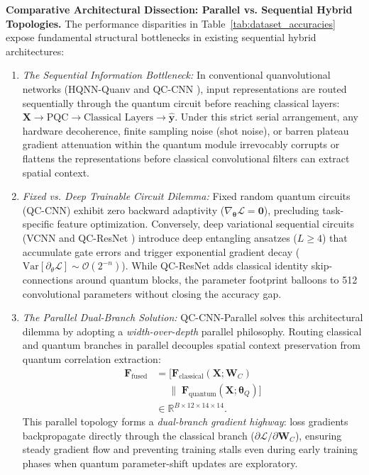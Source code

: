 \documentclass[journal]{IEEEtran}
\begin{document}
\textbf{Comparative Architectural Dissection: Parallel vs. Sequential Hybrid Topologies.} 
The performance disparities in Table~\ref{tab:dataset_accuracies} expose fundamental structural bottlenecks in existing sequential hybrid architectures:
\begin{enumerate}
    \item \textit{The Sequential Information Bottleneck:} In conventional quanvolutional networks (HQNN-Quanv \cite{senokosov2024quantum} and QC-CNN \cite{henderson2020quanvolutional}), input representations are routed sequentially through the quantum circuit before reaching classical layers: $\mathbf{X} \to \text{PQC} \to \text{Classical Layers} \to \hat{\mathbf{y}}$. Under this strict serial arrangement, any hardware decoherence, finite sampling noise (shot noise), or barren plateau gradient attenuation within the quantum module irrevocably corrupts or flattens the representations before classical convolutional filters can extract spatial context.
    \item \textit{Fixed vs. Deep Trainable Circuit Dilemma:} Fixed random quantum circuits (QC-CNN) exhibit zero backward adaptivity ($\nabla_{\boldsymbol{\theta}} \mathcal{L} = \mathbf{0}$), precluding task-specific feature optimization. Conversely, deep variational sequential circuits (VCNN and QC-ResNet \cite{kashif2024resqnets}) introduce deep entangling ansatzes ($L \ge 4$) that accumulate gate errors and trigger exponential gradient decay ($\mathrm{Var}[\partial_{\theta} \mathcal{L}] \sim \mathcal{O}(2^{-n})$). While QC-ResNet adds classical identity skip-connections around quantum blocks, the parameter footprint balloons to 512 convolutional parameters without closing the accuracy gap.
    \item \textit{The Parallel Dual-Branch Solution:} QC-CNN-Parallel solves this architectural dilemma by adopting a \textit{width-over-depth} parallel philosophy. Routing classical and quantum branches in parallel decouples spatial context preservation from quantum correlation extraction:
    \begin{align}
    \mathbf{F}_{\mathrm{fused}} &= \Big[ \mathbf{F}_{\mathrm{classical}}(\mathbf{X}; \mathbf{W}_C) \nonumber \\
    &\quad\; \|\; \mathbf{F}_{\mathrm{quantum}}(\mathbf{X}; \boldsymbol{\theta}_Q) \Big] \nonumber \\
    &\in \mathbb{R}^{B \times 12 \times 14 \times 14}.
    \label{eq:parallel_channel_fusion}
    \end{align}
    This parallel topology forms a \textit{dual-branch gradient highway}: loss gradients backpropagate directly through the classical branch ($\partial \mathcal{L} / \partial \mathbf{W}_C$), ensuring steady gradient flow and preventing training stalls even during early training phases when quantum parameter-shift updates are exploratory.
\end{enumerate}
\end{document}
